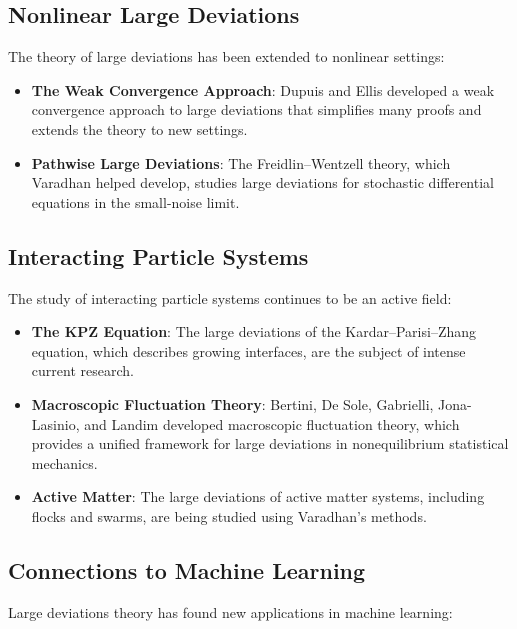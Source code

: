 \subsection{Nonlinear Large Deviations}

The theory of large deviations has been extended to nonlinear settings:

\begin{itemize}
\item \textbf{The Weak Convergence Approach}: Dupuis and Ellis developed a weak convergence approach to large deviations that simplifies many proofs and extends the theory to new settings.

\item \textbf{Pathwise Large Deviations}: The Freidlin--Wentzell theory, which Varadhan helped develop, studies large deviations for stochastic differential equations in the small-noise limit.
\end{itemize}

\subsection{Interacting Particle Systems}

The study of interacting particle systems continues to be an active field:

\begin{itemize}
\item \textbf{The KPZ Equation}: The large deviations of the Kardar--Parisi--Zhang equation, which describes growing interfaces, are the subject of intense current research.

\item \textbf{Macroscopic Fluctuation Theory}: Bertini, De Sole, Gabrielli, Jona-Lasinio, and Landim developed macroscopic fluctuation theory, which provides a unified framework for large deviations in nonequilibrium statistical mechanics.

\item \textbf{Active Matter}: The large deviations of active matter systems, including flocks and swarms, are being studied using Varadhan's methods.
\end{itemize}

\subsection{Connections to Machine Learning}

Large deviations theory has found new applications in machine learning:

